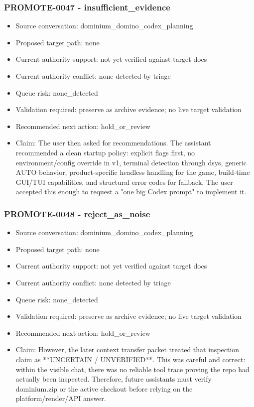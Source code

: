 \documentclass[11pt,a4paper]{report}
\begin{document}
\subsubsection{PROMOTE-0047 - insufficient\_evidence}

\begin{itemize}
\item Source conversation: dominium\_domino\_codex\_planning
\item Proposed target path: none
\item Current authority support: not yet verified against target docs
\item Current authority conflict: none detected by triage
\item Queue risk: none\_detected
\item Validation required: preserve as archive evidence; no live target validation
\item Recommended next action: hold\_or\_review
\item Claim: The user then asked for recommendations. The assistant recommended a clean startup policy: explicit flags first, no environment/config override in v1, terminal detection through dsys, generic AUTO behavior, product-specific headless handling for the game, build-time GUI/TUI capabilities, and structural error codes for fallback. The user accepted this enough to request a "one big Codex prompt" to implement it.
\end{itemize}

\subsubsection{PROMOTE-0048 - reject\_as\_noise}

\begin{itemize}
\item Source conversation: dominium\_domino\_codex\_planning
\item Proposed target path: none
\item Current authority support: not yet verified against target docs
\item Current authority conflict: none detected by triage
\item Queue risk: none\_detected
\item Validation required: preserve as archive evidence; no live target validation
\item Recommended next action: hold\_or\_review
\item Claim: However, the later context transfer packet treated that inspection claim as **UNCERTAIN / UNVERIFIED**. This was careful and correct: within the visible chat, there was no reliable tool trace proving the repo had actually been inspected. Therefore, future assistants must verify dominium.zip or the active checkout before relying on the platform/render/API answer.
\end{itemize}
\end{document}
